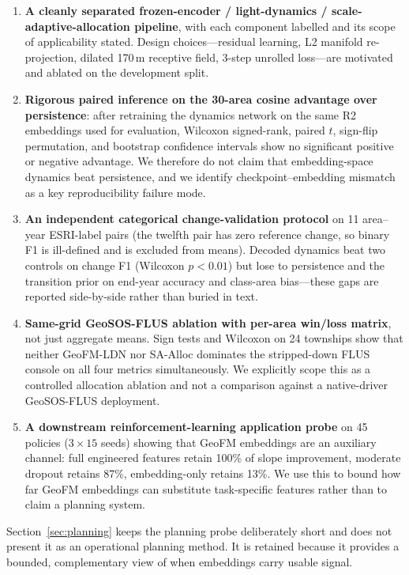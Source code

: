 \documentclass{article}
\begin{document}
\begin{enumerate}
\item \textbf{A cleanly separated frozen-encoder / light-dynamics / scale-adaptive-allocation pipeline}, with each component labelled and its scope of applicability stated. Design choices---residual learning, L2 manifold re-projection, dilated 170\,m receptive field, 3-step unrolled loss---are motivated and ablated on the development split.

\item \textbf{Rigorous paired inference on the 30-area cosine advantage over persistence}: after retraining the dynamics network on the same R2 embeddings used for evaluation, Wilcoxon signed-rank, paired $t$, sign-flip permutation, and bootstrap confidence intervals show no significant positive or negative advantage. We therefore do not claim that embedding-space dynamics beat persistence, and we identify checkpoint--embedding mismatch as a key reproducibility failure mode.

\item \textbf{An independent categorical change-validation protocol} on 11 area--year ESRI-label pairs (the twelfth pair has zero reference change, so binary F1 is ill-defined and is excluded from means). Decoded dynamics beat two controls on change F1 (Wilcoxon $p<0.01$) but lose to persistence and the transition prior on end-year accuracy and class-area bias---these gaps are reported side-by-side rather than buried in text.

\item \textbf{Same-grid GeoSOS-FLUS ablation with per-area win/loss matrix}, not just aggregate means. Sign tests and Wilcoxon on 24 townships show that neither GeoFM-LDN nor SA-Alloc dominates the stripped-down FLUS console on all four metrics simultaneously. We explicitly scope this as a controlled allocation ablation and not a comparison against a native-driver GeoSOS-FLUS deployment.

\item \textbf{A downstream reinforcement-learning application probe} on 45 policies ($3\times 15$ seeds) showing that GeoFM embeddings are an auxiliary channel: full engineered features retain 100\% of slope improvement, moderate dropout retains 87\%, embedding-only retains 13\%. We use this to bound how far GeoFM embeddings can substitute task-specific features rather than to claim a planning system.
\end{enumerate}

Section~\ref{sec:planning} keeps the planning probe deliberately short and does not present it as an operational planning method. It is retained because it provides a bounded, complementary view of when embeddings carry usable signal.
\end{document}
